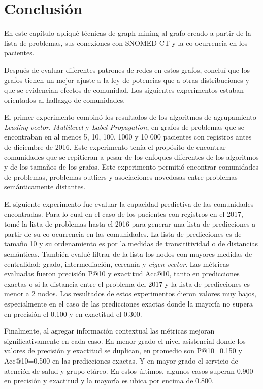 \section{Conclusión}
En este capítulo apliqué técnicas de graph mining al grafo creado a partir de la lista de problemas, sus conexiones con SNOMED CT y la co-ocurrencia en los pacientes. 

Después de evaluar diferentes patrones de redes en estos grafos, concluí que los grafos tienen un mejor ajuste a la ley de potencias que a otras distribuciones y que se evidencian efectos de comunidad. Los siguientes experimentos estaban orientados al hallazgo de comunidades.

El primer experimento combinó los resultados de los algoritmos de agrupamiento \textit{Leading vector}, \textit{Multilevel} y \textit{Label Propagation}, en grafos de problemas que se encontraban en al menos 5, 10, 100, 1000 y 10 000 pacientes con registros antes de diciembre de 2016. Este experimento tenía el propósito de encontrar comunidades que se repitieran a pesar de los enfoques diferentes de los algoritmos y de los tamaños de los grafos. Este experimento permitió encontrar comunidades de problemas, problemas outliers y asociaciones novedosas entre problemas semánticamente distantes.

El siguiente experimento fue evaluar la capacidad predictiva de las comunidades encontradas. Para lo cual en el caso de los pacientes con registros en el 2017, tomé la lista de problemas hasta el 2016 para generar una lista de predicciones a partir de su co-ocurrencia en las comunidades. La lista de predicciones es de tamaño 10 y su ordenamiento es por la medidas de transititividad o de distancias semánticas. También evalué filtrar de la lista los nodos con mayores medidas de centralidad: grado, intermediación, cercanía y \textit{eigen vector}. Las métricas evaluadas fueron precisión P@10 y exactitud Acc@10, tanto en predicciones exactas o si la distancia entre el problema del 2017 y la lista de predicciones es menor a 2 nodos. Los resultados de estos experimentos dieron valores muy bajos, especialmente en el caso de las predicciones exactas donde la mayoría no supera en precisión el \num{0.100} y en exactitud el \num{0.300}.

Finalmente, al agregar información contextual las métricas mejoran significativamente en cada caso. En menor grado el nivel asistencial donde los valores de precisión y exactitud se duplican, en promedio son P@10=\num{0.150} y Acc@10=\num{0.500} en las predicciones exactas. Y en mayor grado el servicio de atención de salud y grupo etáreo. En estos últimos, algunos casos superan \num{0.900} en precisión y exactitud y la mayoría es ubica por encima de \num{0.800}.

